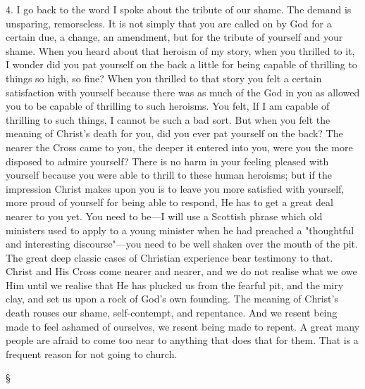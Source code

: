 \documentclass[12pt,a5paper,twoside,titlepage]{book}
\begin{document}
4. I go back to the word I spoke about the 
tribute of our shame. The demand is unsparing, 
remorseless. It is not simply that you 
are called on by God for a certain due, a 
change, an amendment, but for the tribute of 
yourself and your shame. When you heard 
about that heroism of my story, when you 
thrilled to it, I wonder did you pat yourself on 
the back a little for being capable of thrilling 
to things so high, so fine? When you thrilled 
to that story you felt a certain satisfaction with 
yourself because there was as much of the God 
in you as allowed you to be capable of thrilling 
to such heroisms. You felt, If I am capable of 
thrilling to such things, I cannot be such a bad 
sort. But when you felt the meaning of 
Christ's death for you, did you ever pat yourself 
on the back? The nearer the Cross came to 
you, the deeper it entered into you, were you 
the more disposed to admire yourself? There is 
no harm in your feeling pleased with yourself 
because you were able to thrill to these human 
heroisms; but if the impression Christ makes 
upon you is to leave you more satisfied with 
yourself, more proud of yourself for being able
to respond, He has to get a great deal nearer to 
you yet. You need to be---I will use a Scottish 
phrase which old ministers used to apply to 
a young minister when he had preached a 
"thoughtful and interesting discourse"---you 
need to be well shaken over the mouth of the 
pit. The great deep classic cases of Christian 
experience bear testimony to that. Christ and 
His Cross come nearer and nearer, and we do 
not realise what we owe Him until we realise 
that He has plucked us from the fearful pit, 
and the miry clay, and set us upon a rock of 
God's own founding. The meaning of Christ's 
death rouses our shame, self-contempt, and 
repentance. And we resent being made to feel 
ashamed of ourselves, we resent being made to 
repent. A great many people are afraid to 
come too near to anything that does that for 
them. That is a frequent reason for not going 
to church. 

\begin{center} \S \end{center} 
\end{document}
